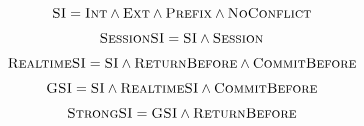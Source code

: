 \begin{frame}{}
  \[
	\textsc{SI} = \textsc{Int} \land \textsc{Ext} \land \textsc{Prefix} \land \textsc{NoConflict}
  \]
\end{frame}

\begin{frame}{}
  \[
	\textsc{SessionSI} = \textsc{SI} \land \textsc{Session}
  \]

  \pause
  \[
	\textsc{RealtimeSI} = \textsc{SI} \land \textsc{ReturnBefore} \land \textsc{CommitBefore}
  \]

  \pause
  \[
	\textsc{GSI} = \textsc{SI} \land \textsc{RealtimeSI} \land \textsc{CommitBefore}
  \]

  \pause
  \[
	\textsc{StrongSI} = \textsc{GSI} \land \textsc{ReturnBefore}
  \]
\end{frame}

\begin{frame}{}
  \begin{columns}
	  \begin{itemize}
	  	\item \ansisi
	  	\item \si
	  	\item \gsi
	  	\item \strongsi
	  	\item \strongsessionsi
	  	\item \parallelsi
	  	\item \wsi
	  	\item \nmsi
	  	\item \pcsi
	  \end{itemize}
  \end{columns}
\end{frame}
